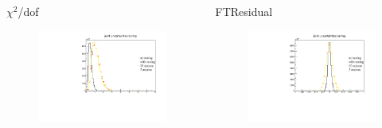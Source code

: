 \documentclass[aspectratio=1610, 12pt]{beamer}
\begin{document}
\begin{frame}
  \begin{columns}
    \begin{column}[c]{0.48\textwidth}
      $\chi^2$/dof
      \begin{figure}
        \includegraphics[width=\textwidth]{plots/compi/chi2_per_ndof_comp_looser.pdf}
      \end{figure}
    \end{column}
    \begin{column}[c]{0.48\textwidth}
      FTResidual
      \begin{figure}
        \includegraphics[width=\textwidth]{plots/compi/FTResidual_comp_looser.pdf}
      \end{figure}
    \end{column}
  \end{columns}
\end{frame}
\end{document}

